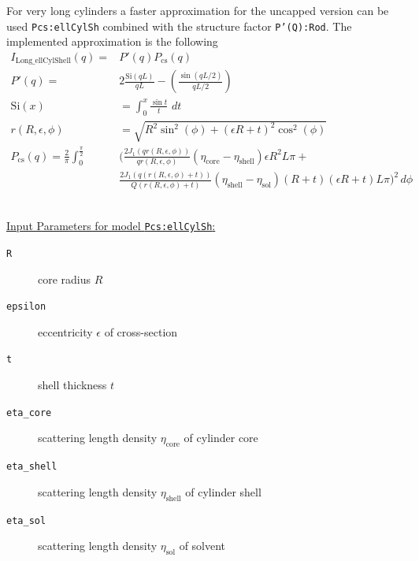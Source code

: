 \noindent For very long cylinders a faster approximation for the
uncapped version can be used \texttt{Pcs:ellCylSh}
combined with the structure factor \texttt{P'(Q):Rod}.
The implemented approximation is the following
\begin{align}
  I_\text{Long\_ellCylShell}(q) = & P'(q) P_\text{cs}(q) \\
  P'(q)  = & 2 \frac{\text{Si}(q L)}{qL} - \left(\frac{\sin(qL/2)}{qL/2}\right) \\
  \text{Si}(x) & = \int_0^x\!\frac{\sin t}{t}\,\,dt \\
  r(R,\epsilon,\phi) &= \sqrt{R^2\sin^2(\phi)+(\epsilon R+t)^2\cos^2(\phi)}\\
  P_\text{cs}(q)  =  \frac{2}{\pi} \int_0^{\frac{\pi}{2}}& \biggl(
            \frac{2J_1(qr(R,\epsilon,\phi))}{qr(R,\epsilon,\phi)}
            \left(\eta_\text{core}-\eta_\text{shell}\right)\epsilon R^2L\pi + \\
         &
            \frac{2J_1(q(r(R,\epsilon,\phi)+t))}{Q(r(R,\epsilon,\phi)+t)}
            \left(\eta_\text{shell}-\eta_\text{sol}\right)(R+t)(\epsilon R+t)L\pi
      \biggr)^2  \, d\phi \nonumber
\end{align}

\hspace{1pt}\\
\underline{Input Parameters for model \texttt{Pcs:ellCylSh}:}\\
\begin{description}
\item[\texttt{R}] core radius $R$
\item[\texttt{epsilon}] eccentricity $\epsilon$ of cross-section
\item[\texttt{t}] shell thickness $t$
\item[\texttt{eta\_core}] scattering length density $\eta_\text{core}$ of cylinder core
\item[\texttt{eta\_shell}] scattering length density $\eta_\text{shell}$ of cylinder shell
\item[\texttt{eta\_sol}] scattering length density $\eta_\text{sol}$ of solvent
\end{description}


